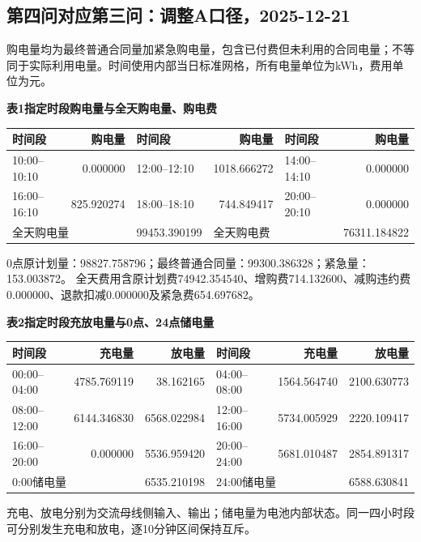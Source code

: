 \subsection{第四问对应第三问：调整A口径，2025-12-21}
\begingroup\small
\setlength{\tabcolsep}{4pt}\renewcommand{\arraystretch}{1.08}
\setlength{\LTpre}{4pt}\setlength{\LTpost}{4pt}
\noindent 购电量均为最终普通合同量加紧急购电量，包含已付费但未利用的合同电量；不等同于实际利用电量。时间使用内部当日标准网格，所有电量单位为kWh，费用单位为元。
\begin{center}\textbf{表1\quad 指定时段购电量与全天购电量、购电费}\par\smallskip
\begin{tabular}{lr lr lr}\toprule
时间段 & 购电量 & 时间段 & 购电量 & 时间段 & 购电量\\\midrule
10:00--10:10 & 0.000000 & 12:00--12:10 & 1018.666272 & 14:00--14:10 & 0.000000\\
16:00--16:10 & 825.920274 & 18:00--18:10 & 744.849417 & 20:00--20:10 & 0.000000\\
\midrule
\multicolumn{2}{l}{全天购电量} & 99453.390199 & \multicolumn{2}{l}{全天购电费} & 76311.184822\\
\bottomrule\end{tabular}\end{center}
\noindent 0点原计划量：98827.758796；最终普通合同量：99300.386328；紧急量：153.003872。
全天费用含原计划费74942.354540、增购费714.132600、减购违约费0.000000、退款扣减0.000000及紧急费654.697682。
\begin{center}\textbf{表2\quad 指定时段充放电量与0点、24点储电量}\par\smallskip
\begin{tabular}{lrr lrr}\toprule
时间段 & 充电量 & 放电量 & 时间段 & 充电量 & 放电量\\\midrule
00:00--04:00 & 4785.769119 & 38.162165 & 04:00--08:00 & 1564.564740 & 2100.630773\\
08:00--12:00 & 6144.346830 & 6568.022984 & 12:00--16:00 & 5734.005929 & 2220.109417\\
16:00--20:00 & 0.000000 & 5536.959420 & 20:00--24:00 & 5681.010487 & 2854.891317\\
\midrule
\multicolumn{2}{l}{0:00储电量} & 6535.210198 & \multicolumn{2}{l}{24:00储电量} & 6588.630841\\
\bottomrule\end{tabular}\end{center}
\noindent 充电、放电分别为交流母线侧输入、输出；储电量为电池内部状态。同一四小时段可分别发生充电和放电，逐10分钟区间保持互斥。
